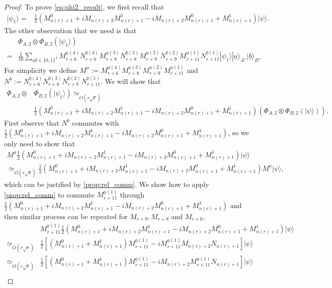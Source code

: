 \documentclass[11pt,letterpaper]{article}
\newcommand{\ket}[1]{|#1\rangle}
\newcommand{\x}{\otimes}
\newcommand{\1}{\mathbb{1}}
\newcommand{\nr}{n(r)}
\newcommand{\ua}{\underline{a}}
\newcommand{\ub}{\underline{b}}
\newcommand{\se}{\sqrt{\epsilon}}
\newcommand{\appd}[1]{\simeq_{#1}}
\theoremstyle{definition}
\begin{document}
\begin{proof}
To prove \cref{eq:phi2_result}, we first
recall that 
\begin{align}
	\ket{\psi_1} 
	=&\frac{1}{2} (M_{\nr+1}^0 + iM_{\nr+2}M_{\nr+1}^1 - iM_{\nr+2}M_{\nr+1}^0 + M_{\nr+1}^1) \ket{\psi}.
\end{align}
The other observation that we need is that 
\begin{align}
	&\Phi_{A,2} \x \Phi_{B,2} (\ket{\psi_1})  \\
	= &\frac{1}{16} \sum_{\ua \ub \in\{0,1\}^4}
	M_{r+6}^{\ua(4)}N_{r+6}^{\ub(4)}M_{r+8}^{\ua(3)}N_{r+8}^{\ub(3)}M_{r+9}^{\ua(2)}N_{r+9}^{\ub(2)}M_{r+11}^{\ua(1)}N_{r+11}^{\ub(1)}
	\ket{\psi_1} \ket{\ua}_{A''} \ket{\ub}_{B''}
\end{align}
For simplicity we define $M^{\ua} := M_{r+6}^{\ua(4)}M_{r+8}^{\ua(3)}M_{r+9}^{\ua(2)}M_{r+11}^{\ua(1)}$ and
$N^{\ub} := N_{r+6}^{\ub(4)}N_{r+8}^{\ub(3)}N_{r+9}^{\ub(2)}N_{r+11}^{\ub(1)} $.
We will show that 
\begin{align}
	\Phi_{A,2} \x &\Phi_{B,2} (\ket{\psi_1}) \appd{O(r\se)} \\
	&\frac{1}{2} (M_{\nr+1}^0 + iM_{\nr+2}M_{\nr+1}^1 - iM_{\nr+2}M_{\nr+1}^0 + M_{\nr+1}^1)(\Phi_{A,2} \x \Phi_{B,2}(\ket{\psi})).
\end{align}
First observe that $N^{\ub}$ commutes with $\frac{1}{2} (M_{\nr+1}^0 + iM_{\nr+2}M_{\nr+1}^1 - iM_{\nr+2}M_{\nr+1}^0 + M_{\nr+1}^1)$, so
we only need to show that 
\begin{align}
	M^{\ua} \frac{1}{2} (M_{\nr+1}^0 + iM_{\nr+2}M_{\nr+1}^1 - iM_{\nr+2}M_{\nr+1}^0 + M_{\nr+1}^1) \ket{\psi} \\
	\appd{O(r\se)}
	\frac{1}{2} (M_{\nr+1}^0 + iM_{\nr+2}M_{\nr+1}^1 - iM_{\nr+2}M_{\nr+1}^0 + M_{\nr+1}^1) M^{\ua} \ket{\psi},
\end{align}
which can be justified by \cref{prop:rel_comm}.
We show how to apply \cref{prop:rel_comm} to commute $M_{r+11}^{\ua(1)}$ through 
$\frac{1}{2} (M_{\nr+1}^0 + iM_{\nr+2}M_{\nr+1}^1 - iM_{\nr+2}M_{\nr+1}^0 + M_{\nr+1}^1)$ and then similar process can be repeated for $M_{r+9}, M_{r+8}$ and $M_{r+6}$,
\begin{align}
	&M_{r+11}^{\ua(1)} \frac{1}{2} (M_{\nr+1}^0 + iM_{\nr+2}M_{\nr+1}^1 - iM_{\nr+2}M_{\nr+1}^0 + M_{\nr+1}^1) \ket{\psi} \\
	\appd{O(r\se)} &\frac{1}{2}[ (M_{\nr+1}^0+M_{\nr+1}^1) M_{r+11}^{\ua(1)} -i M_{r+11}^{\ua(1)} M_{\nr+2}N_{\nr+1}] \ket{\psi} \\
	\appd{O(r\se)} &\frac{1}{2} [(M_{\nr+1}^0+M_{\nr+1}^1) M_{r+11}^{\ua(1)} - iM_{\nr+2}M_{r+11}^{\ua(1)} N_{\nr+1}] \ket{\psi} \\

\end{align}
\end{proof}
\end{document}
